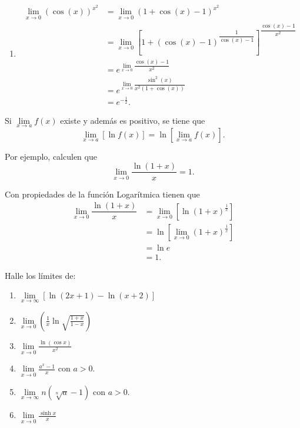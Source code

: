 \begin{example}
\begin{enumerate}
		\item \begin{align*}
		\lim\limits_{x\to 0}\left(\cos(x)\right)^{x^2}&=\lim\limits_{x\to 0}\left(1+\cos(x)-1\right)^{x^2}\\
		&=\lim\limits_{x\to 0}\left[1+\left(\cos(x)-1\right)^{\dfrac{1}{\cos(x)-1}}\right]^{\dfrac{\cos(x)-1}{x^2}}\\
		&=e^{\lim\limits_{x\to 0}\dfrac{\cos(x)-1}{x^2}}\\
		&=e^{\lim\limits_{x\to 0}\dfrac{\sin^2(x)}{x^2(1+\cos(x))}}\\
		&=e^{-\frac{1}{2}}.
		\end{align*}
	\end{enumerate}
\end{example}

\begin{property}
	Si \(\lim\limits_{x\to a}f(x)\) existe y adem\'as es positivo, se tiene que
	\[
	\lim\limits_{x\to a}\left[\ln f(x)\right]=\ln\left[\lim\limits_{x\to a}f(x)\right].
	\]
\end{property}

Por ejemplo, calculen que
\[
\lim\limits_{x\to 0}\dfrac{\ln(1+x)}{x}=1.
\]

Con propiedades de la funci\'on Logar\'itmica tienen que
\begin{align*}
\lim\limits_{x\to 0}\dfrac{\ln(1+x)}{x}&=\lim\limits_{x\to 0}\left[\ln(1+x)^{\frac{1}{x}}\right]\\
&=\ln\left[\lim\limits_{x\to 0}(1+x)^{\frac{1}{x}}\right]\\
&=\ln e\\
&=1.
\end{align*}

\begin{exercise}
	Halle los l\'imites de:
	\begin{enumerate}
		\item \(\lim\limits_{x\to\infty}\left[\ln(2x+1)-\ln(x+2)\right]\)
		\item \(\lim\limits_{x\to 0}\left(\frac{1}{x}\ln\sqrt{\frac{1+x}{1-x}}\right)\)
		\item \(\lim\limits_{x\to 0}\frac{\ln(\cos x)}{x^2}\)
		\item \(\lim\limits_{x\to 0}\frac{a^x-1}{x}\) con \(a>0.\)
		\item \(\lim\limits_{x\to \infty}n\left(\sqrt[n]{a}-1\right)\) con \(a>0.\)
		\item \(\lim\limits_{x\to 0}\frac{\sinh x}{x}\)
	\end{enumerate}
\end{exercise}

